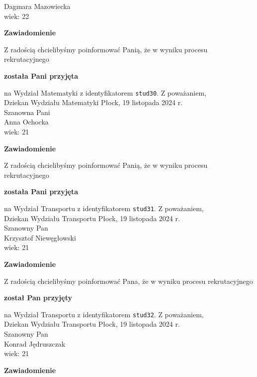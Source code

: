 \documentclass[12pt,a4paper]{article}
\begin{document}
Dagmara Mazowiecka \\
wiek: 22
\bigskip
\begin{center}
    {\Large\textbf{Zawiadomienie}}
\end{center}
\bigskip 
Z radością chcielibyśmy poinformować Panią, że w wyniku procesu rekrutacyjnego
\begin{center}
\textsf{\textbf{została Pani przyjęta}}
\end{center}
na Wydział Matematyki z identyfikatorem \verb|stud30|. 
\vspace{2cm}
\noindent
Z poważaniem, \\
Dziekan
Wydziału Matematyki
\newpage
\hfill Płock, 19 listopada 2024 r. \\
\noindent
Szanowna Pani \\
Anna Ochocka \\
wiek: 21
\bigskip
\begin{center}
    {\Large\textbf{Zawiadomienie}}
\end{center}
\bigskip 
Z radością chcielibyśmy poinformować Panią, że w wyniku procesu rekrutacyjnego
\begin{center}
\textsf{\textbf{została Pani przyjęta}}
\end{center}
na Wydział Transportu z identyfikatorem \verb|stud31|. 
\vspace{2cm}
\noindent
Z poważaniem, \\
Dziekan
Wydziału Transportu
\newpage
\hfill Płock, 19 listopada 2024 r. \\
\noindent
Szanowny Pan \\
Krzysztof Niewęgłowski \\
wiek: 21
\bigskip
\begin{center}
    {\Large\textbf{Zawiadomienie}}
\end{center}
\bigskip 
Z radością chcielibyśmy poinformować Pana, że w wyniku procesu rekrutacyjnego
\begin{center}
\textsf{\textbf{został Pan przyjęty}}
\end{center}
na Wydział Transportu z identyfikatorem \verb|stud32|. 
\vspace{2cm}
\noindent
Z poważaniem, \\
Dziekan
Wydziału Transportu
\newpage
\hfill Płock, 19 listopada 2024 r. \\
\noindent
Szanowny Pan \\
Konrad Jędruszczak \\
wiek: 21
\bigskip
\begin{center}
    {\Large\textbf{Zawiadomienie}}
\end{center}
\end{document}
